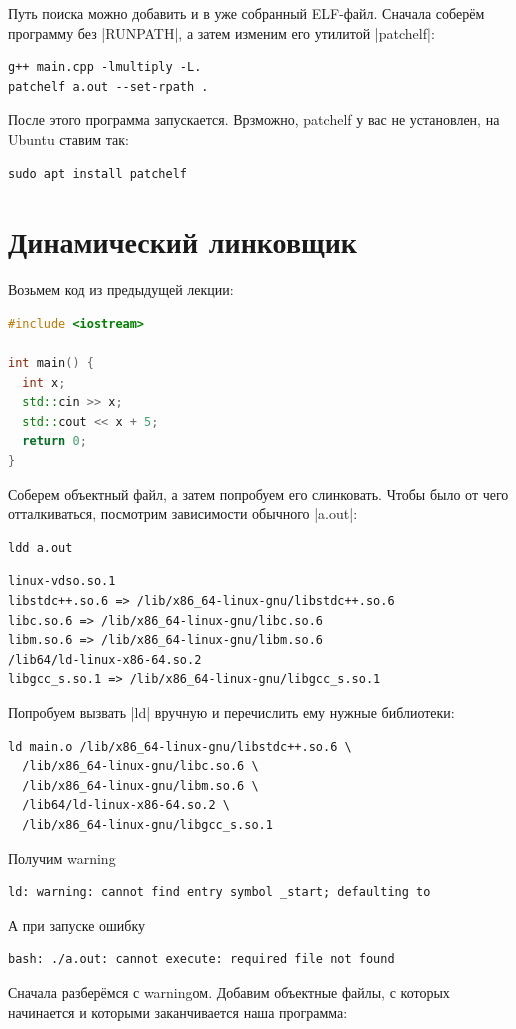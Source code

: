 \documentclass[11pt]{article}
\begin{document}
Путь поиска можно добавить и в уже собранный ELF-файл. Сначала соберём программу
без \nolint|RUNPATH|, а затем изменим его утилитой \nolint|patchelf|:

\begin{lstlisting}
g++ main.cpp -lmultiply -L.
patchelf a.out --set-rpath .
\end{lstlisting}

После этого программа запускается. Врзможно, patchelf у вас не установлен, на Ubuntu ставим так:
\begin{lstlisting}
sudo apt install patchelf
\end{lstlisting}

\newpage
\section{Динамический линковщик}

Возьмем код из предыдущей лекции:
\begin{lstlisting}[language=C++]
#include <iostream>

int main() {
  int x;
  std::cin >> x;
  std::cout << x + 5;
  return 0;
}
\end{lstlisting}
Соберем объектный файл, а затем попробуем его слинковать. Чтобы было от чего отталкиваться, посмотрим зависимости обычного \nolint|a.out|:

\begin{lstlisting}
ldd a.out
\end{lstlisting}

\begin{lstlisting}[style=nolint]
linux-vdso.so.1
libstdc++.so.6 => /lib/x86_64-linux-gnu/libstdc++.so.6
libc.so.6 => /lib/x86_64-linux-gnu/libc.so.6
libm.so.6 => /lib/x86_64-linux-gnu/libm.so.6
/lib64/ld-linux-x86-64.so.2
libgcc_s.so.1 => /lib/x86_64-linux-gnu/libgcc_s.so.1
\end{lstlisting}

Попробуем вызвать \nolint|ld| вручную и перечислить ему нужные библиотеки:

\begin{lstlisting}
ld main.o /lib/x86_64-linux-gnu/libstdc++.so.6 \
  /lib/x86_64-linux-gnu/libc.so.6 \
  /lib/x86_64-linux-gnu/libm.so.6 \
  /lib64/ld-linux-x86-64.so.2 \
  /lib/x86_64-linux-gnu/libgcc_s.so.1
\end{lstlisting}
Получим warning
\begin{lstlisting}
ld: warning: cannot find entry symbol _start; defaulting to
\end{lstlisting}
А при запуске ошибку
\begin{lstlisting}
bash: ./a.out: cannot execute: required file not found
\end{lstlisting}
\newpage
Сначала разберёмся с warningом. Добавим объектные файлы, с которых начинается и которыми заканчивается наша программа:
\end{document}
